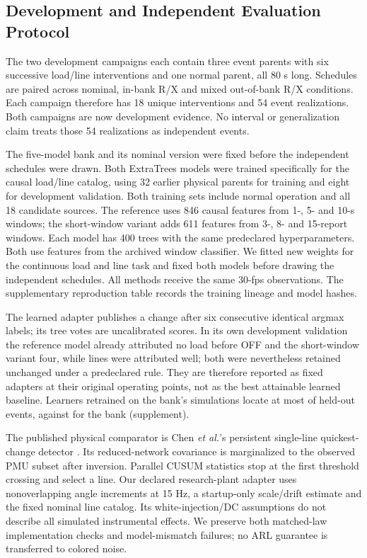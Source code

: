 \subsection{Development and Independent Evaluation Protocol}
The two development campaigns each contain three event parents with six successive load/line interventions and one normal parent, all 80 s long. Schedules are paired across nominal, in-bank R/X and mixed out-of-bank R/X conditions. Each campaign therefore has 18 unique interventions and 54 event realizations. Both campaigns are now development evidence. No interval or generalization claim treats those 54 realizations as independent events.

The five-model bank and its nominal version were fixed before the
independent schedules were drawn. Both ExtraTrees models were trained
specifically for the causal load/line catalog, using 32 earlier physical
parents for training and eight for development validation. Both training sets include normal operation and
all 18 candidate sources. The reference uses 846 causal features from
1-, 5- and 10-s windows; the short-window variant adds 611 features from
3-, 8- and 15-report windows. Each model has 400 trees with the same
predeclared hyperparameters. Both use features from the archived
window classifier. We fitted new weights for the continuous load and
line task and fixed both models before drawing the independent schedules.
All methods receive the same 30-fps observations. The supplementary
reproduction table records the training lineage and model hashes.

The learned adapter publishes a change after six consecutive identical
argmax labels; its tree votes are uncalibrated scores. In its own
development validation the reference model already attributed no load
before OFF and the short-window variant four, while lines were attributed
well; both were nevertheless retained unchanged under a predeclared rule.
They are therefore reported as fixed adapters at their original operating
points, not as the best attainable learned baseline. Learners retrained on the bank's simulations locate at most \FBBestTop{} of \FBEvents{} held-out events, against \FBBankTop{} for the bank (supplement).

The published physical comparator is Chen \emph{et al.}'s persistent single-line quickest-change detector \cite{chen2016quickest}. Its reduced-network covariance is marginalized to the observed PMU subset after inversion. Parallel CUSUM statistics stop at the first threshold crossing and select a line. Our declared research-plant adapter uses nonoverlapping angle increments at 15 Hz, a startup-only scale/drift estimate and the fixed nominal line catalog. Its white-injection/DC assumptions do not describe all simulated instrumental effects. We preserve both matched-law implementation checks and model-mismatch failures; no ARL guarantee is transferred to colored noise.

